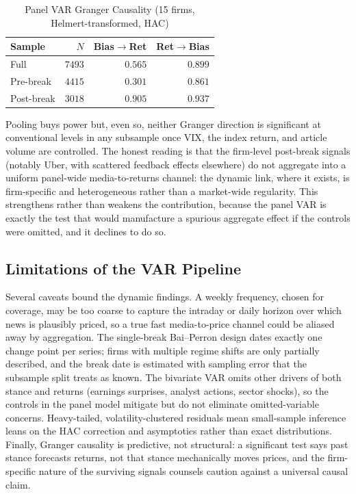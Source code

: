 \documentclass[conference]{IEEEtran}
\begin{document}
\begin{table}[!t]
\caption{Panel VAR Granger Causality (15 firms, Helmert-transformed, HAC)}
\label{tab:panelvar}
\centering
\small
\begin{tabular}{lrrr}
\toprule
Sample & $N$ & Bias$\to$Ret & Ret$\to$Bias \\
\midrule
Full        & $7493$ & $0.565$ & $0.899$ \\
Pre-break   & $4415$ & $0.301$ & $0.861$ \\
Post-break  & $3018$ & $0.905$ & $0.937$ \\
\bottomrule
\end{tabular}
\end{table}

Pooling buys power but, even so, neither Granger direction is significant at
conventional levels in any subsample once VIX, the index return, and article
volume are controlled. The honest reading is that the firm-level post-break
signals (notably Uber, with scattered feedback effects elsewhere) do not
aggregate into a uniform panel-wide media-to-returns channel: the dynamic link, where it exists, is
firm-specific and heterogeneous rather than a market-wide regularity. This
strengthens rather than weakens the contribution, because the panel VAR is
exactly the test that would manufacture a spurious aggregate effect if the
controls were omitted, and it declines to do so.

\subsection{Limitations of the VAR Pipeline}
Several caveats bound the dynamic findings. A weekly frequency, chosen for
coverage, may be too coarse to capture the intraday or daily horizon over which
news is plausibly priced, so a true fast media-to-price channel could be
aliased away by aggregation. The single-break Bai--Perron design dates exactly
one change point per series; firms with multiple regime shifts are only partially
described, and the break date is estimated with sampling error that the
subsample split treats as known. The bivariate VAR omits other drivers of both
stance and returns (earnings surprises, analyst actions, sector shocks), so the
controls in the panel model mitigate but do not eliminate omitted-variable
concerns. Heavy-tailed, volatility-clustered residuals mean small-sample
inference leans on the HAC correction and asymptotics rather than exact
distributions. Finally, Granger causality is predictive, not structural: a
significant test says past stance forecasts returns, not that stance
mechanically moves prices, and the firm-specific nature of the surviving signals
counsels caution against a universal causal claim.
\end{document}
